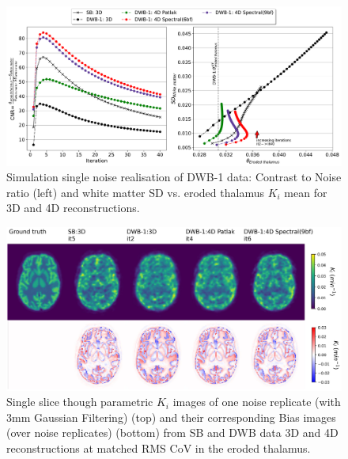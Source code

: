 \begin{figure} [ht!]
\centering
\includegraphics[scale=0.45,angle=0]{3_Results/3_2_Dynamic_Reconstruction_SimulationStudy/figures/Single/3_8_SingleReplicate.pdf}
\caption{Simulation single noise realisation of DWB-1 data: Contrast to Noise ratio (left) and white matter SD vs. eroded thalamus $K_i$ mean for 3D and 4D reconstructions.} 
\label{fig:3_2_SingleReplicateMeanCov}
\end{figure} 

\begin{figure} [h!]
\centering
\includegraphics[scale=0.47,angle=0]{3_Results/3_2_Dynamic_Reconstruction_SimulationStudy/figures/BrainCuts/BrainCuts.pdf}
\caption{Single slice though parametric $K_i$ images of one noise replicate (with 3mm Gaussian Filtering) (top) and their corresponding Bias images (over noise replicates) (bottom) from SB and DWB data 3D and 4D reconstructions at matched RMS CoV in the eroded thalamus.}
\label{fig:cuts_bias_matched_rms_CoV}
\end{figure} 

